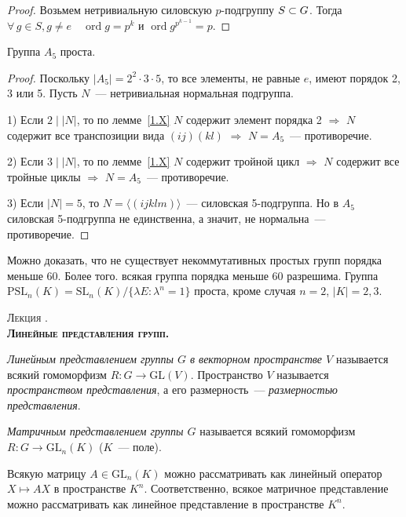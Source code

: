 \documentclass[a4paper]{article}
\newcounter{lec}
\renewcommand{\thelec}{\Roman{lec}}
\newcommand*{\lecture}[1]{\refstepcounter{lec}\vspace{20pt}
\begin{center}{\rmfamily\textsc{Лекция \thelec. \\ \textbf{#1}}}\vspace{5pt}
\end{center}}
\newcommand{\ord}{\mathop{\mathrm{ord}}\nolimits}
\newcommand*{\p}[1]{#1\nobreak\discretionary{}{\hbox{$\mathsurround=0pt #1$}}{}}
\begin{document}
\begin{proof}
Возьмем нетривиальную силовскую $p$-подгруппу $S\p\subset G$. Тогда
$\forall \, g\in S, g\neq e\quad \ord g=p^k$ и $\ord g^{p^{k-1}}=p$.
\end{proof}

\begin{theorem}
Группа $A_5$ проста.
\end{theorem}

\begin{proof}
Поскольку $|A_5|=2^2\cdot 3\cdot 5$, то все элементы, не равные $e$,
имеют порядок 2, 3 или 5. Пусть $N$~--- нетривиальная нормальная
подгруппа.

1) Если $2\mid|N|$, то по лемме~\ref{1.X} $N$ содержит элемент
порядка 2 $\Rightarrow$ $N$ содержит все транспозиции вида
$(ij)(kl)$ $\Rightarrow$ $N=A_5$~--- противоречие.

2) Если $3\mid|N|$, то по лемме~\ref{1.X} $N$ содержит тройной цикл
$\Rightarrow$ $N$ содержит все тройные циклы $\Rightarrow$
$N=A_5$~--- противоречие.

3) Если $|N|=5$, то $N=\langle(ijklm)\rangle$~--- силовская
5-подгруппа. Но в $A_5$ силовская 5-подгруппа не единственна, а
значит, не нормальна~--- противоречие.
\end{proof}

\begin{zam}
Можно доказать, что не существует некоммутативных простых групп
порядка меньше 60. Более того. всякая группа порядка меньше 60
разрешима. Группа
$\mathrm{P\mathrm{SL}}_n(K)=\mathrm{SL}_n(K)/\{\lambda E:
\lambda^n=1\}$ проста, кроме случая $n=2$, $|K|=2,3$.
\end{zam}
\lecture{Линейные представления групп.}

\emph{Линейным представлением группы $G$ в векторном пространстве
$V$} называется всякий гомоморфизм $R\colon G\to \mathrm{GL}(V)$.
Пространство $V$ называется \emph{пространством представления}, а
его размерность~--- \emph{размерностью представления}.

\emph{Матричным представлением группы $G$} называется всякий
гомоморфизм $R\colon G\to \mathrm{GL}_n(K)$ ($K$~--- поле).

Всякую матрицу $A\in \mathrm{GL}_n(K)$ можно рассматривать как
линейный оператор $X\mapsto AX$ в пространстве $K^n$.
Соответственно, всякое матричное представление можно рассматривать
как линейное представление в пространстве $K^n$.
\end{document}
